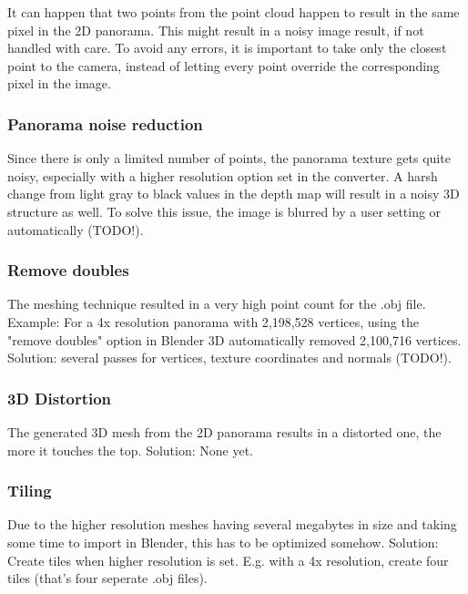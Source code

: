 It can happen that two points from the point cloud happen to result in the same pixel in the 2D panorama. This might result in a noisy image result, if not handled with care. To avoid any errors, it is important to take only the closest point to the camera, instead of letting every point override the corresponding pixel in the image.

\subsubsection{Panorama noise reduction}

Since there is only a limited number of points, the panorama texture gets quite noisy, especially with a higher resolution option set in the converter. A harsh change from light gray to black values in the depth map will result in a noisy 3D structure as well.
To solve this issue, the image is blurred by a user setting or automatically (TODO!).

\subsubsection{Remove doubles}

The meshing technique resulted in a very high point count for the .obj file. Example: For a 4x resolution panorama with 2,198,528 vertices, using the "remove doubles" option in Blender 3D automatically removed 2,100,716 vertices.
Solution: several passes for vertices, texture coordinates and normals (TODO!).

\subsubsection{3D Distortion}

The generated 3D mesh from the 2D panorama results in a distorted one, the more it touches the top.
Solution: None yet.

\subsubsection{Tiling}

Due to the higher resolution meshes having several megabytes in size and taking some time to import in Blender, this has to be optimized somehow.
Solution: Create tiles when higher resolution is set. E.g. with a 4x resolution, create four tiles (that's four seperate .obj files).